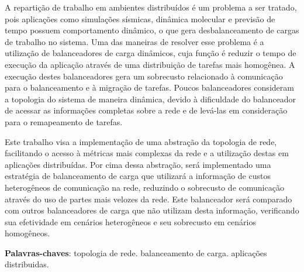 \documentclass[
	12pt,				%
	openright,			%
	twoside,			%
	a4paper,			%
	english,			%
	brazil,				%
	]{abntex2}
\begin{document}
\begin{resumo}

A repartição de trabalho em ambientes distribuídos é um problema a ser tratado, pois aplicações como simulações sísmicas, dinâmica molecular e previsão de tempo possuem comportamento dinâmico, o que gera desbalanceamento de cargas de trabalho no sistema. Uma das maneiras de resolver esse problema é a utilização de balanceadores de carga dinâmicos, cuja função é reduzir o tempo de execução da aplicação através de uma distribuição de tarefas mais homogênea. A execução destes balanceadores gera um sobrecusto relacionado à comunicação para o balanceamento e à migração de tarefas. Poucos balanceadores consideram a topologia do sistema de maneira dinâmica, devido à dificuldade do balanceador de acessar as informações completas sobre a rede e de levá-las em consideração para o remapeamento de tarefas.

Este trabalho visa a implementação de uma abstração da topologia de rede, facilitando o acesso à métricas mais complexas da rede e a utilização destas em aplicações distribuídas. Por cima dessa abstração, será implementado uma estratégia de balanceamento de carga que utilizará a informação de custos heterogêneos de comunicação na rede, reduzindo o sobrecusto de comunicação através do uso de partes mais velozes da rede. Este balanceador será comparado com outros balanceadores de carga que não utilizam desta informação, verificando sua efetividade em cenários heterogêneos e seu sobrecusto em cenários homogêneos.



 \vspace{\onelineskip}
    
 \noindent
 \textbf{Palavras-chaves}: topologia de rede. balanceamento de carga. aplicações distribuidas.
 
\end{resumo}
\end{document}
